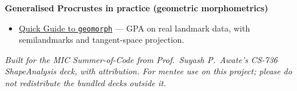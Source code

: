 \documentclass[11pt]{article}
\begin{document}
\textbf{Generalised Procrustes in practice (geometric morphometrics)}
\begin{itemize}[nosep,leftmargin=*]
  \item \href{http://www.emmasherratt.com/uploads/2/1/6/0/21606686/quick_guide_to_geomorph-_gpa.html}{Quick Guide to \texttt{geomorph}} --- GPA on real landmark data, with semilandmarks and tangent-space projection.
\end{itemize}

\vfill
\begin{center}\small\itshape
Built for the MIC Summer-of-Code from Prof.\ Suyash P.\ Awate's CS-736
ShapeAnalysis deck, with attribution. For mentee use on this project; please do
not redistribute the bundled decks outside it.
\end{center}
\end{document}
